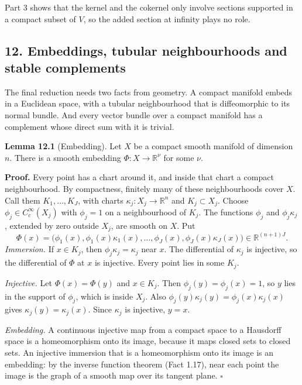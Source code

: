 \documentclass[
  11pt,
]{article}
\begin{document}
Part 3 shows that the kernel and the cokernel only involve sections
supported in a compact subset of \(V\), so the added section at infinity
plays no role.

\subsection{12. Embeddings, tubular neighbourhoods and stable
complements}\label{embeddings-tubular-neighbourhoods-and-stable-complements}

The final reduction needs two facts from geometry. A compact manifold
embeds in a Euclidean space, with a tubular neighbourhood that is
diffeomorphic to its normal bundle. And every vector bundle over a
compact manifold has a complement whose direct sum with it is trivial.

\textbf{Lemma 12.1} (Embedding). Let \(X\) be a compact smooth manifold
of dimension \(n\). There is a smooth embedding
\(\Phi:X\to\mathbb R^\nu\) for some \(\nu\).

\textbf{Proof.} Every point has a chart around it, and inside that chart
a compact neighbourhood. By compactness, finitely many of these
neighbourhoods cover \(X\). Call them \(K_1,\dots,K_J\), with charts
\(\kappa_j:X_j\to\mathbb R^n\) and \(K_j\subset X_j\). Choose
\(\phi_j\in C_c^\infty(X_j)\) with \(\phi_j=1\) on a neighbourhood of
\(K_j\). The functions \(\phi_j\) and \(\phi_j\kappa_j\), extended by
zero outside \(X_j\), are smooth on \(X\). Put \[
\Phi(x)=\bigl(\phi_1(x),\phi_1(x)\kappa_1(x),\dots,\phi_J(x),\phi_J(x)\kappa_J(x)\bigr)\in\mathbb R^{(n+1)J}.
\] \emph{Immersion.} If \(x\in K_j\), then \(\phi_j\kappa_j=\kappa_j\)
near \(x\). The differential of \(\kappa_j\) is injective, so the
differential of \(\Phi\) at \(x\) is injective. Every point lies in some
\(K_j\).

\emph{Injective.} Let \(\Phi(x)=\Phi(y)\) and \(x\in K_j\). Then
\(\phi_j(y)=\phi_j(x)=1\), so \(y\) lies in the support of \(\phi_j\),
which is inside \(X_j\). Also
\(\phi_j(y)\kappa_j(y)=\phi_j(x)\kappa_j(x)\) gives
\(\kappa_j(y)=\kappa_j(x)\). Since \(\kappa_j\) is injective, \(y=x\).

\emph{Embedding.} A continuous injective map from a compact space to a
Hausdorff space is a homeomorphism onto its image, because it maps
closed sets to closed sets. An injective immersion that is a
homeomorphism onto its image is an embedding: by the inverse function
theorem (Fact 1.17), near each point the image is the graph of a smooth
map over its tangent plane. \(\square\)
\end{document}
